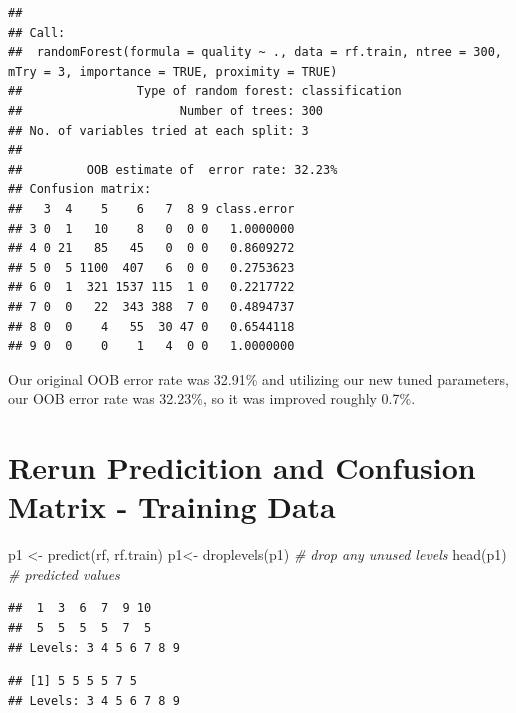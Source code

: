 \documentclass[
]{book}
\newenvironment{Shaded}{\begin{snugshade}}{\end{snugshade}}
\newcommand{\CommentTok}[1]{\textcolor[rgb]{0.56,0.35,0.01}{\textit{#1}}}
\newcommand{\FunctionTok}[1]{\textcolor[rgb]{0.00,0.00,0.00}{#1}}
\newcommand{\NormalTok}[1]{#1}
\newcommand{\OtherTok}[1]{\textcolor[rgb]{0.56,0.35,0.01}{#1}}
\newcommand{\SpecialCharTok}[1]{\textcolor[rgb]{0.00,0.00,0.00}{#1}}
\begin{document}
\begin{verbatim}
## 
## Call:
##  randomForest(formula = quality ~ ., data = rf.train, ntree = 300,      mTry = 3, importance = TRUE, proximity = TRUE) 
##                Type of random forest: classification
##                      Number of trees: 300
## No. of variables tried at each split: 3
## 
##         OOB estimate of  error rate: 32.23%
## Confusion matrix:
##   3  4    5    6   7  8 9 class.error
## 3 0  1   10    8   0  0 0   1.0000000
## 4 0 21   85   45   0  0 0   0.8609272
## 5 0  5 1100  407   6  0 0   0.2753623
## 6 0  1  321 1537 115  1 0   0.2217722
## 7 0  0   22  343 388  7 0   0.4894737
## 8 0  0    4   55  30 47 0   0.6544118
## 9 0  0    0    1   4  0 0   1.0000000
\end{verbatim}

Our original OOB error rate was 32.91\% and utilizing our new tuned parameters, our OOB error rate was 32.23\%, so it was improved roughly 0.7\%.

\hypertarget{rerun-predicition-and-confusion-matrix---training-data}{%
\section{Rerun Predicition and Confusion Matrix - Training Data}\label{rerun-predicition-and-confusion-matrix---training-data}}

\begin{Shaded}
\begin{Highlighting}[]
\NormalTok{p1 }\OtherTok{\textless{}{-}} \FunctionTok{predict}\NormalTok{(rf, rf.train)}
\NormalTok{p1}\OtherTok{\textless{}{-}} \FunctionTok{droplevels}\NormalTok{(p1) }\CommentTok{\# drop any unused levels}
\FunctionTok{head}\NormalTok{(p1) }\CommentTok{\# predicted values}
\end{Highlighting}
\end{Shaded}

\begin{verbatim}
##  1  3  6  7  9 10 
##  5  5  5  5  7  5 
## Levels: 3 4 5 6 7 8 9
\end{verbatim}

\begin{Shaded}
\end{Shaded}

\begin{verbatim}
## [1] 5 5 5 5 7 5
## Levels: 3 4 5 6 7 8 9
\end{verbatim}
\end{document}
